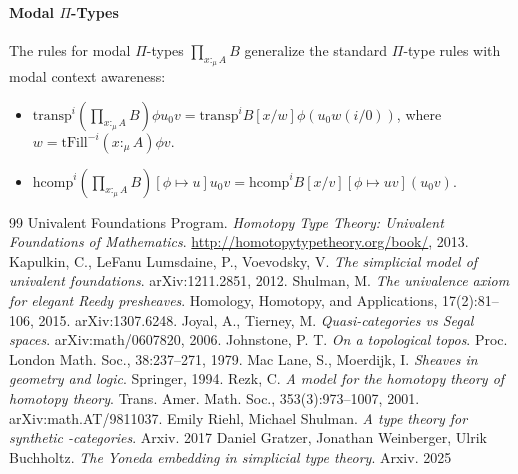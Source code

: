 \documentclass{article}
\begin{document}
\paragraph{Modal $\Pi$-Types}
The rules for modal $\Pi$-types $\prod_{x :_\mu A} B$ generalize the standard $\Pi$-type rules with modal context awareness:
\begin{itemize}
    \item $\text{transp}^i (\prod_{x :_\mu A} B) \phi u_0 v = \text{transp}^i B[x/w] \phi (u_0 w(i/0))$, where $w = \text{tFill}^{-i} (x :_\mu A) \phi v$.
    \item $\text{hcomp}^i (\prod_{x :_\mu A} B) [\phi \mapsto u] u_0 v = \text{hcomp}^i B[x/v] [\phi \mapsto u v] (u_0 v)$.
\end{itemize}

\newpage

\begin{thebibliography}{99}
 Univalent Foundations Program. \emph{Homotopy Type Theory: Univalent Foundations of Mathematics}. \url{http://homotopytypetheory.org/book/}, 2013.
 Kapulkin, C., LeFanu Lumsdaine, P., Voevodsky, V. \emph{The simplicial model of univalent foundations}. arXiv:1211.2851, 2012.
 Shulman, M. \emph{The univalence axiom for elegant Reedy presheaves}. Homology, Homotopy, and Applications, 17(2):81--106, 2015. arXiv:1307.6248.
 Joyal, A., Tierney, M. \emph{Quasi-categories vs Segal spaces}. arXiv:math/0607820, 2006.
 Johnstone, P. T. \emph{On a topological topos}. Proc. London Math. Soc., 38:237--271, 1979.
 Mac Lane, S., Moerdijk, I. \emph{Sheaves in geometry and logic}. Springer, 1994.
 Rezk, C. \emph{A model for the homotopy theory of homotopy theory}. Trans. Amer. Math. Soc., 353(3):973--1007, 2001. arXiv:math.AT/9811037.
 Emily Riehl, Michael Shulman. \emph{A type theory for synthetic -categories}. Arxiv. 2017
 Daniel Gratzer, Jonathan Weinberger, Ulrik Buchholtz. \emph{The Yoneda embedding in simplicial type theory}. Arxiv. 2025
\end{thebibliography}
\end{document}
